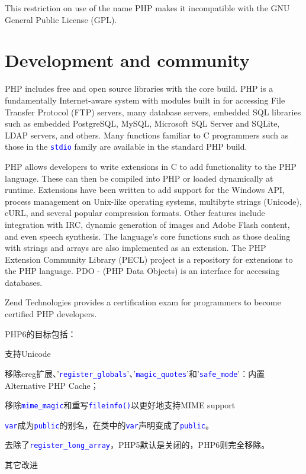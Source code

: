 This restriction on use of the name PHP makes it incompatible with the GNU General Public License (GPL).





\chapter{Development and community}

PHP includes free and open source libraries with the core build. PHP is a fundamentally Internet-aware system with modules built in for accessing File Transfer Protocol (FTP) servers, many database servers, embedded SQL libraries such as embedded PostgreSQL, MySQL, Microsoft SQL Server and SQLite, LDAP servers, and others. Many functions familiar to C programmers such as those in the \textcolor{Blue}{\texttt{stdio}} family are available in the standard PHP build.


PHP allows developers to write extensions in C to add functionality to the PHP language. These can then be compiled into PHP or loaded dynamically at runtime. Extensions have been written to add support for the Windows API, process management on Unix-like operating systems, multibyte strings (Unicode), cURL, and several popular compression formats. Other features include integration with IRC, dynamic generation of images and Adobe Flash content, and even speech synthesis. The language's core functions such as those dealing with strings and arrays are also implemented as an extension. The PHP Extension Community Library (PECL) project is a repository for extensions to the PHP language. PDO - (PHP Data Objects) is an interface for accessing databases.

Zend Technologies provides a certification exam for programmers to become certified PHP developers.

PHP6的目标包括：

\begin{compactitem}
\item 支持Unicode
\item 移除ereg扩展、'\textcolor{Blue}{\texttt{register\_globals}}'、'\textcolor{Blue}{\texttt{magic\_quotes}}'和'\textcolor{Blue}{\texttt{safe\_mode}}'：内置Alternative PHP Cache；
\item 移除\textcolor{Blue}{\texttt{mime\_magic}}和重写\textcolor{Blue}{\texttt{fileinfo()}}以更好地支持MIME support
\item \textcolor{Blue}{\texttt{var}}成为\textcolor{Blue}{\texttt{public}}的别名，在类中的\textcolor{Blue}{\texttt{var}}声明变成了\textcolor{Blue}{\texttt{public}}。
\item 去除了\textcolor{Blue}{\texttt{register\_long\_array}}，PHP5默认是关闭的，PHP6则完全移除。
\item 其它改进
\end{compactitem}




